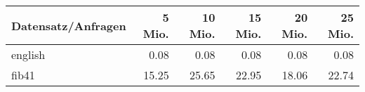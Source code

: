 \documentclass[10pt,a4paper]{standalone}
\begin{document}
\begin{tabular}{|l|r|r|r|r|r|}
\hline
Datensatz/Anfragen & 5 Mio. & 10 Mio. & 15 Mio. & 20 Mio. & 25 Mio. \\
\hline\hline
english & 0.08 & 0.08 & 0.08 & 0.08 & 0.08 \\
fib41 & 15.25 & 25.65 & 22.95 & 18.06 & 22.74 \\
\hline
\end{tabular}
\end{document}
